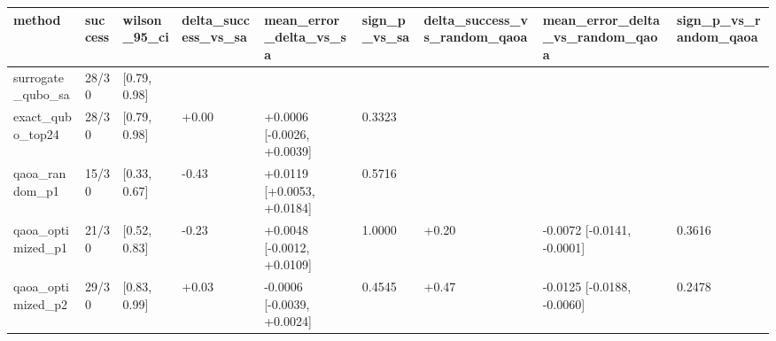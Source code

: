 \begin{tabular}{lllllllll}
\toprule
method & success & wilson\_95\_ci & delta\_success\_vs\_sa & mean\_error\_delta\_vs\_sa & sign\_p\_vs\_sa & delta\_success\_vs\_random\_qaoa & mean\_error\_delta\_vs\_random\_qaoa & sign\_p\_vs\_random\_qaoa \\
\midrule
surrogate\_qubo\_sa & 28/30 & [0.79, 0.98] &  &  &  &  &  &  \\
exact\_qubo\_top24 & 28/30 & [0.79, 0.98] & +0.00 & +0.0006 [-0.0026, +0.0039] & 0.3323 &  &  &  \\
qaoa\_random\_p1 & 15/30 & [0.33, 0.67] & -0.43 & +0.0119 [+0.0053, +0.0184] & 0.5716 &  &  &  \\
qaoa\_optimized\_p1 & 21/30 & [0.52, 0.83] & -0.23 & +0.0048 [-0.0012, +0.0109] & 1.0000 & +0.20 & -0.0072 [-0.0141, -0.0001] & 0.3616 \\
qaoa\_optimized\_p2 & 29/30 & [0.83, 0.99] & +0.03 & -0.0006 [-0.0039, +0.0024] & 0.4545 & +0.47 & -0.0125 [-0.0188, -0.0060] & 0.2478 \\
\bottomrule
\end{tabular}

